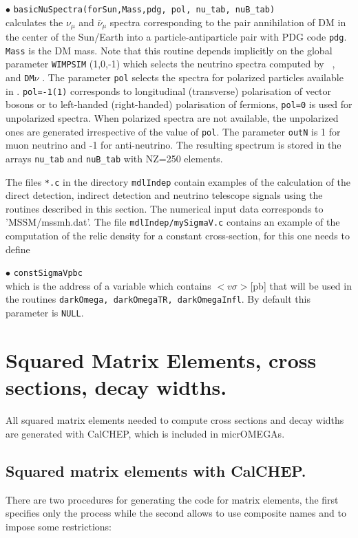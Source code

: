 \documentclass[12pt,a4paper]{article}
\begin{document}
\noindent
$\bullet$ \verb|basicNuSpectra(forSun,Mass,pdg, pol, nu_tab, nuB_tab) |\\
calculates  the $\nu_{\mu}$   and  $\bar{\nu}_{\mu}$ spectra
corresponding to the pair annihilation of DM in the center of the Sun/Earth
into a particle-antiparticle pair with PDG code {\tt pdg}. \verb|Mass| is the DM mass.
Note that this
routine depends implicitly on the global parameter {\tt WIMPSIM} (1,0,-1) which selects the neutrino spectra computed by
 \wimpsim~\cite{Blennow:2007tw}, \pppc~\cite{Baratella:2013fya} and  {\tt DM$\nu$}
\cite{Cirelli:2005gh}.
The parameter {\tt pol} selects the spectra for  polarized particles available  in
\pppc. {\tt pol=-1(1)} corresponds to longitudinal (transverse) polarisation
of vector bosons or to left-handed (right-handed)  polarisation of  fermions, {\tt pol=0}
is used for unpolarized spectra. When polarized spectra are not available, the unpolarized ones are generated irrespective of the value of \verb|pol|. 
The parameter {\tt outN} is 1 for muon neutrino and -1 for anti-neutrino. The resulting spectrum is stored in the
arrays   \verb|nu_tab| and \verb|nuB_tab| with NZ=250 elements.


The files {\verb|*.c|} in the directory {\tt mdlIndep}  contain examples of the calculation of the direct detection,  indirect detection 
and neutrino telescope signals using the routines described in this section. 
The numerical input data  corresponds to 'MSSM/mssmh.dat'.  The file {\tt mdlIndep/mySigmaV.c}   contains an example of the computation of the relic density for a constant cross-section, for this one needs to define 

\noindent
$\bullet$ \verb|constSigmaVpbc|\\
which is the address of a variable which contains $<v\sigma>$[pb] that will be used in the routines {\tt darkOmega, darkOmegaTR, darkOmegaInfl}.
By default this parameter is {\tt NULL}.   

\section{Squared Matrix Elements, cross sections, decay widths.}
\label{cross_section}

All squared matrix elements needed to compute cross sections and decay widths are generated with CalCHEP, which is included in micrOMEGAs.


\subsection{Squared matrix elements with CalCHEP.}
 There are two procedures for generating the code for matrix elements, the first specifies only the process   while the second allows to use composite names and  to impose some restrictions:\\ 
\end{document}
